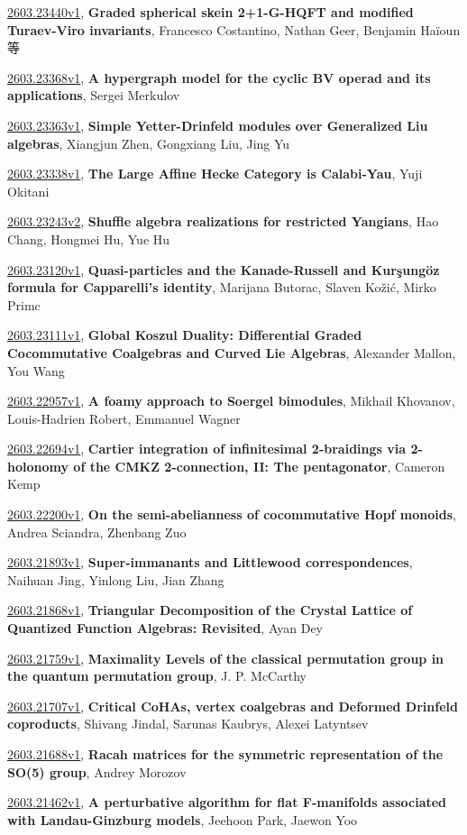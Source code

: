 \documentclass[9pt, a4paper]{article}
\theoremstyle{plain}
\theoremstyle{definition}
\theoremstyle{remark}
\newcommand{\arxiv}[3]{\href{https://arxiv.org/abs/#1}{#1}, \textbf{\textcolor{arxivblue}{#2}}, #3}
\begin{document}
\arxiv{2603.23440v1}{Graded spherical skein 2+1-G-HQFT and modified Turaev-Viro invariants}{Francesco Costantino, Nathan Geer, Benjamin Haïoun 等}

\arxiv{2603.23368v1}{A hypergraph model for the cyclic BV operad and its applications}{Sergei Merkulov}

\arxiv{2603.23363v1}{Simple Yetter-Drinfeld modules over Generalized Liu algebras}{Xiangjun Zhen, Gongxiang Liu, Jing Yu}

\arxiv{2603.23338v1}{The Large Affine Hecke Category is Calabi-Yau}{Yuji Okitani}

\arxiv{2603.23243v2}{Shuffle algebra realizations for restricted Yangians}{Hao Chang, Hongmei Hu, Yue Hu}

\arxiv{2603.23120v1}{Quasi-particles and the Kanade-Russell and Kurşungöz formula for Capparelli's identity}{Marijana Butorac, Slaven Kožić, Mirko Primc}

\arxiv{2603.23111v1}{Global Koszul Duality: Differential Graded Cocommutative Coalgebras and Curved Lie Algebras}{Alexander Mallon, You Wang}

\arxiv{2603.22957v1}{A foamy approach to Soergel bimodules}{Mikhail Khovanov, Louis-Hadrien Robert, Emmanuel Wagner}

\arxiv{2603.22694v1}{Cartier integration of infinitesimal 2-braidings via 2-holonomy of the CMKZ 2-connection, II: The pentagonator}{Cameron Kemp}

\arxiv{2603.22200v1}{On the semi-abelianness of cocommutative Hopf monoids}{Andrea Sciandra, Zhenbang Zuo}

\arxiv{2603.21893v1}{Super-immanants and Littlewood correspondences}{Naihuan Jing, Yinlong Liu, Jian Zhang}

\arxiv{2603.21868v1}{Triangular Decomposition of the Crystal Lattice of Quantized Function Algebras: Revisited}{Ayan Dey}

\arxiv{2603.21759v1}{Maximality Levels of the classical permutation group in the quantum permutation group}{J. P. McCarthy}

\arxiv{2603.21707v1}{Critical CoHAs, vertex coalgebras and Deformed Drinfeld coproducts}{Shivang Jindal, Sarunas Kaubrys, Alexei Latyntsev}

\arxiv{2603.21688v1}{Racah matrices for the symmetric representation of the SO(5) group}{Andrey Morozov}

\arxiv{2603.21462v1}{A perturbative algorithm for flat F-manifolds associated with Landau-Ginzburg models}{Jeehoon Park, Jaewon Yoo}

\end{document}
